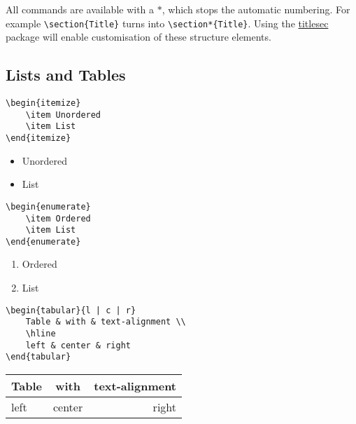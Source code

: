 \documentclass{article}
\begin{document}
All commands are available with a $*$, which stops the automatic numbering. For example \verb|\section{Title}| turns into \verb|\section*{Title}|. Using the \href{http://tug.ctan.org/tex-archive/macros/latex/contrib/titlesec/titlesec.pdf}{titlesec} package will enable customisation of these structure elements.


\subsection*{Lists and Tables}
\begin{multicols}{2}
    \begin{lstlisting}[style=codeblock]
\begin{itemize}
    \item Unordered
    \item List
\end{itemize}
    \end{lstlisting}
    \columnbreak
    \begin{itemize}
        \item Unordered
        \item List
    \end{itemize}
\end{multicols}

\begin{multicols}{2}
    \begin{lstlisting}[style=codeblock]
\begin{enumerate}
    \item Ordered
    \item List
\end{enumerate}
    \end{lstlisting}
    \columnbreak
    \begin{enumerate}
        \item Ordered
        \item List
    \end{enumerate}
\end{multicols}
   
\begin{multicols}{2}
    \begin{lstlisting}[style=codeblock]
\begin{tabular}{l | c | r}
    Table & with & text-alignment \\
    \hline
    left & center & right
\end{tabular}
    \end{lstlisting}
    \columnbreak
    \begin{tabular}{l | c | r}
        Table & with & text-alignment \\
        \hline
        left & center & right
    \end{tabular}
\end{multicols}
\end{document}
